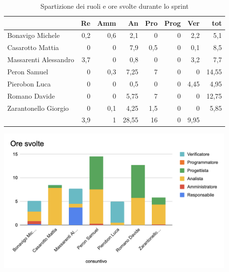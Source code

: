\begin{table}[ht]
    \begin{tabularx}{\linewidth}{X|rrrrrrr}
    \rowcolor{gray!30}& Re & Amm & An & Pro & Prog & Ver & tot \\
    \hline
    Bonavigo Michele                        & 0,2 & 0,6 & 2,1 & 0 & 0 & 2,2  & 5,1 \\
    \rowcolor{gray!10}Casarotto Mattia      & 0 & 0 & 7,9 & 0,5 & 0 & 0,1 & 8,5 \\
    Massarenti Alessandro                   & 3,7 & 0 & 0,8 & 0 & 0 & 3,2  & 7,7 \\
    \rowcolor{gray!10}Peron Samuel          & 0 & 0,3 & 7,25 & 7 & 0 & 0 & 14,55 \\
    Pierobon Luca                           & 0 & 0 & 0,5 & 0 & 0 & 4,45 & 4,95 \\
    \rowcolor{gray!10}Romano Davide         & 0 & 0 & 5,75 & 7 & 0 & 0 & 12,75 \\
    Zarantonello Giorgio                    & 0 & 0,1 & 4,25 & 1,5 & 0 & 0 & 5,85 \\
    \hline                                  & 3,9 & 1 & 28,55 & 16 & 0 & 9,95 & \\
    \end{tabularx}
    \caption{\label{ruoli-persone}Spartizione dei ruoli e ore svolte durante lo sprint}
\end{table}

\begin{center}
\includegraphics[width=12cm]{img/ore-svolte.png}
\end{center}


